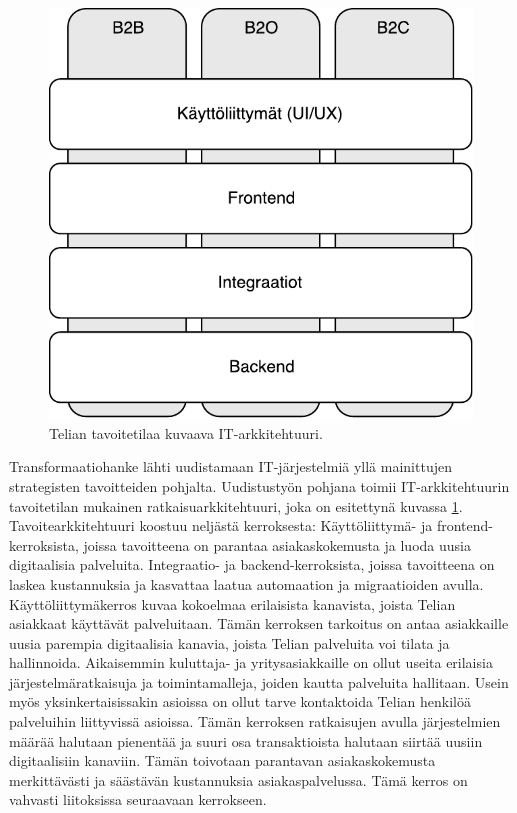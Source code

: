 \documentclass[finnish,12pt,a4paper,pdftex]{article}
\begin{document}
\begin{figure}[!h]
    \centering
    \includegraphics[scale=0.5]{images/ratkaisuarkkitehtuuri.pdf}
    \caption{Telian tavoitetilaa kuvaava IT-arkkitehtuuri.}
    \label{fig:ratkark}
\end{figure}

Transformaatiohanke lähti uudistamaan IT-järjestelmiä yllä mainittujen strategisten tavoitteiden pohjalta. Uudistustyön pohjana toimii IT-arkkitehtuurin tavoitetilan mukainen ratkaisuarkkitehtuuri, joka on esitettynä kuvassa \ref{fig:ratkark}. Tavoitearkkitehtuuri koostuu neljästä kerroksesta: Käyttöliittymä- ja frontend-kerroksista, joissa tavoitteena on parantaa asiakaskokemusta ja luoda uusia digitaalisia palveluita. Integraatio- ja backend-kerroksista, joissa tavoitteena on laskea kustannuksia ja kasvattaa laatua automaation ja migraatioiden avulla.\\

Käyttöliittymäkerros kuvaa kokoelmaa erilaisista kanavista, joista Telian asiakkaat käyttävät palveluitaan. Tämän kerroksen tarkoitus on antaa asiakkaille uusia parempia digitaalisia kanavia, joista Telian palveluita voi tilata ja hallinnoida. Aikaisemmin kuluttaja- ja yritysasiakkaille on ollut useita erilaisia järjestelmäratkaisuja ja toimintamalleja, joiden kautta palveluita hallitaan. Usein myös yksinkertaisissakin asioissa on ollut tarve kontaktoida Telian henkilöä palveluihin liittyvissä asioissa. Tämän kerroksen ratkaisujen avulla järjestelmien määrää halutaan pienentää ja suuri osa transaktioista halutaan siirtää uusiin digitaalisiin kanaviin. Tämän toivotaan parantavan asiakaskokemusta merkittävästi ja säästävän kustannuksia asiakaspalvelussa. Tämä kerros on vahvasti liitoksissa seuraavaan kerrokseen.\\
\end{document}
